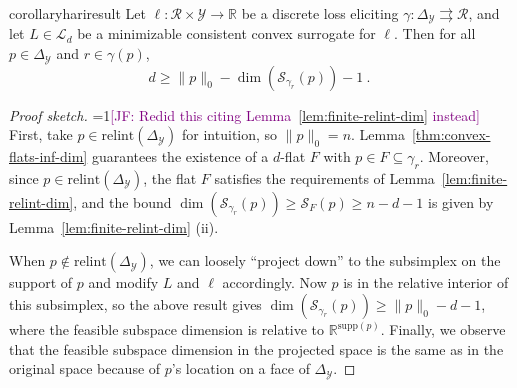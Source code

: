 \documentclass[anon,12pt]{colt2021} %
\newcommand{\Comments}{1}
\newcommand{\mynote}[2]{\ifnum\Comments=1\textcolor{#1}{#2}\fi}
\newcommand{\mytodo}[2]{\ifnum\Comments=1%
	\todo[linecolor=#1!80!black,backgroundcolor=#1,bordercolor=#1!80!black]{#2}\fi}
\newcommand{\jessie}[1]{\mynote{purple}{[JF: #1]}}
\newcommand{\jessiet}[1]{\mytodo{purple!20!white}{JF: #1}}
\newcommand{\bo}[1]{\mynote{blue}{[Bo: #1]}}
\newcommand{\btw}[1]{\mytodo{orange!80!white}{BTW: #1}}
\newcommand{\reals}{\mathbb{R}}
\newcommand{\simplex}{\Delta_\Y}
\newcommand{\relint}[1]{\mathrm{relint}(#1)}
\newcommand{\ccdim}{\mathrm{cc\,dim}}
\newcommand{\supp}{\mathrm{supp}}
\newcommand{\codim}{\mathrm{codim}}
\renewcommand{\L}{\mathcal{L}}
\newcommand{\R}{\mathcal{R}}
\newcommand{\Sc}{\mathcal{S}}  %
\newcommand{\Scr}{\mathcal{S}}  %
\newcommand{\Y}{\mathcal{Y}}
\newcommand{\toto}{\rightrightarrows}
\begin{document}
\begin{restatable}{corollary}{hariresult}\label{cor:fsd-bound}
	Let $\ell:\R \times \Y \to \reals$ be a discrete loss eliciting $\gamma:\simplex \toto \R$, and let $L \in \L_d$ be a minimizable consistent convex surrogate for $\ell$.
	Then for all $p \in \simplex$ and $r \in \gamma(p)$,
	\begin{equation}
	  d \geq \|p\|_0 - \dim(\Sc_{\gamma_r}(p)) - 1~.~
	\end{equation}
\end{restatable}
\begin{proof}[Proof sketch]
	\jessie{Redid this citing Lemma~\ref{lem:finite-relint-dim} instead}
	First, take $p \in \relint{\simplex}$ for intuition, so $\|p\|_0 = n$.
	Lemma~\ref{thm:convex-flats-inf-dim} guarantees the existence of a $d$-flat $F$ with $p \in F \subseteq \gamma_r$.
	Moreover, since $p \in \relint{\simplex}$, the flat $F$ satisfies the requirements of Lemma~\ref{lem:finite-relint-dim}, and the bound $\dim(\Sc_{\gamma_r}(p)) \geq \Scr_F(p) \geq n - d- 1$ is given by Lemma~\ref{lem:finite-relint-dim} (ii).

	When $p \not \in \relint{\simplex}$, we can loosely ``project down'' to the subsimplex on the support of $p$ and modify $L$ and $\ell$ accordingly.
	Now $p$ is in the relative interior of this subsimplex, so the above result gives $\dim(\Sc_{\gamma_r}(p)) \geq \|p\|_0 - d - 1$, where the feasible subspace dimension is relative to $\reals^{\supp(p)}$.
	Finally, we observe that the feasible subspace dimension in the projected space is the same as in the original space because of $p$'s location on a face of $\simplex$.
\end{proof}
\end{document}
